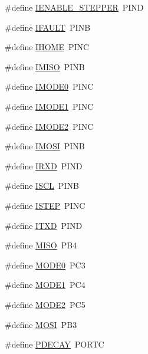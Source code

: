 \begin{DoxyCompactItemize}
\#define \hyperlink{group__biba__config_ga38a64ed512258be4847202d41c945f1d}{I\-E\-N\-A\-B\-L\-E\-\_\-\-S\-T\-E\-P\-P\-E\-R}~P\-I\-N\-D
\item 
\#define \hyperlink{group__biba__config_gaeddf690491247a8a3a624d3e52904fe7}{I\-F\-A\-U\-L\-T}~P\-I\-N\-B
\item 
\#define \hyperlink{group__biba__config_gabd13263a1daa3de2c2e1417449c8e476}{I\-H\-O\-M\-E}~P\-I\-N\-C
\item 
\#define \hyperlink{group__biba__config_ga2bfb9bd5b79538403a1caa9656e248d9}{I\-M\-I\-S\-O}~P\-I\-N\-B
\item 
\#define \hyperlink{group__biba__config_ga2d3f9ece079a1fd5f865181487c06deb}{I\-M\-O\-D\-E0}~P\-I\-N\-C
\item 
\#define \hyperlink{group__biba__config_gaacd24160a55e79573bf115736964e481}{I\-M\-O\-D\-E1}~P\-I\-N\-C
\item 
\#define \hyperlink{group__biba__config_ga0c375abc5fc38a870d36c0432ddf4673}{I\-M\-O\-D\-E2}~P\-I\-N\-C
\item 
\#define \hyperlink{group__biba__config_gadbbd69302ff10bfa13cf87e3e810a79f}{I\-M\-O\-S\-I}~P\-I\-N\-B
\item 
\#define \hyperlink{group__biba__config_ga566802973e97fd0cf4b0ee55aad5a176}{I\-R\-X\-D}~P\-I\-N\-D
\item 
\#define \hyperlink{group__biba__config_ga067354c27a0600f5750fb6bf7db25524}{I\-S\-C\-L}~P\-I\-N\-B
\item 
\#define \hyperlink{group__biba__config_ga5bd5979291487b59ffbe66c85249a0db}{I\-S\-T\-E\-P}~P\-I\-N\-C
\item 
\#define \hyperlink{group__biba__config_ga251454338fb90e437951f785af82f31a}{I\-T\-X\-D}~P\-I\-N\-D
\item 
\#define \hyperlink{group__biba__config_ga7334c540878c8c4d801fd75ed9fd8063}{M\-I\-S\-O}~P\-B4
\item 
\#define \hyperlink{group__biba__config_ga5daa4b780b82b5e8678d8c7095336b62}{M\-O\-D\-E0}~P\-C3
\item 
\#define \hyperlink{group__biba__config_ga443b1268c43b309560d57e34d50b5b3b}{M\-O\-D\-E1}~P\-C4
\item 
\#define \hyperlink{group__biba__config_gab2d8aca64e351712eae6f03e3f9d64ad}{M\-O\-D\-E2}~P\-C5
\item 
\#define \hyperlink{group__biba__config_ga5d3f11f2fdf8a7e27b975291e0c2c8cc}{M\-O\-S\-I}~P\-B3
\item 
\#define \hyperlink{group__biba__config_ga42a58bd5ca7d52e02b78dbc498bd18fc}{P\-D\-E\-C\-A\-Y}~P\-O\-R\-T\-C

\end{DoxyCompactItemize}
